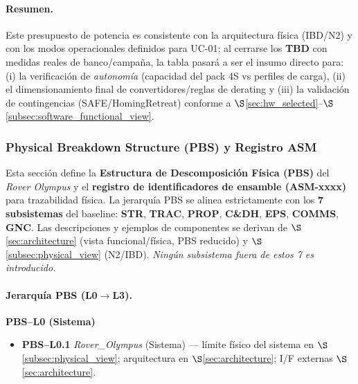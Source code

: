 \paragraph{Resumen.}
Este presupuesto de potencia es consistente con la arquitectura física (IBD/N2) y con los modos operacionales definidos para UC-01; al cerrarse los \textbf{TBD} con medidas reales de banco/campaña, la tabla pasará a ser el insumo directo para: (i) la verificación de \emph{autonomía} (capacidad del pack 4S vs perfiles de carga), (ii) el dimensionamiento final de convertidores/reglas de derating y (iii) la validación de contingencias (SAFE/HomingRetreat) conforme a $\S$\ref{sec:hw_selected}--$\S$\ref{subsec:software_functional_view}. \cite{nasa_cm}


\subsubsection{Physical Breakdown Structure (PBS) y Registro ASM}
\label{sec:pbs_asm}

Esta sección define la \textbf{Estructura de Descomposición Física (PBS)} del \emph{Rover Olympus} y el \textbf{registro de identificadores de ensamble (ASM-xxxx)} para trazabilidad física. La jerarquía PBS se alinea estrictamente con los \textbf{7 subsistemas} del baseline: \textbf{STR}, \textbf{TRAC}, \textbf{PROP}, \textbf{C\&DH}, \textbf{EPS}, \textbf{COMMS}, \textbf{GNC}. Las descripciones y ejemplos de componentes se derivan de $\S$\ref{sec:architecture} (vista funcional/física, PBS reducido) y $\S$\ref{subsec:physical_view} (N2/IBD). \textit{Ningún subsistema fuera de estos 7 es introducido.} \cite{nasa_cm, segoldmine_ppi}

\paragraph{Jerarquía PBS (L0$\rightarrow$L3).}
\label{subsec:pbs_hierarchy}

\noindent\textbf{PBS--L0 (Sistema)} \cite{nasa_cm}
\begin{itemize}
  \item \textbf{PBS--L0.1} \; \textit{Rover\_Olympus} (Sistema) --- límite físico del sistema en $\S$\ref{subsec:physical_view}; arquitectura en $\S$\ref{sec:architecture}; I/F externas $\S$\ref{sec:architecture}.
\end{itemize}

